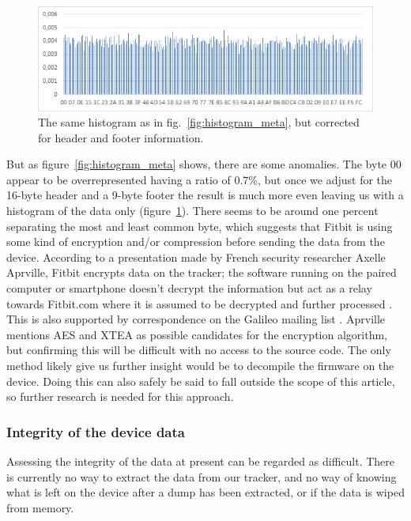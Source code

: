 \documentclass[a4paper,11pt,dvips]{article}
\begin{document}
\begin{figure}
\noindent
\includegraphics[natwidth=624bp,natheight=195bp,width=\linewidth]{histogram_nometa}
\caption{The same histogram as in fig.~\ref{fig:histogram_meta}, but corrected for header and footer information.}
\label{fig:histogram_nometa}
\end{figure}

But as figure~\ref{fig:histogram_meta} shows, there are some anomalies. The byte 00 appear to be overrepresented having a ratio of 0.7\%, but once we adjust for the 16-byte header and a 9-byte footer the result is much more even leaving us with a histogram of the data only (figure~\ref{fig:histogram_nometa}). There seems to be around one percent separating the most and least common byte, which suggests that Fitbit is using some kind of encryption and/or compression before sending the data from the device. According to a presentation made by French security researcher Axelle Aprville, Fitbit encrypts data on the tracker; the software running on the paired computer or smartphone doesn't decrypt the information but act as a relay towards Fitbit.com where it is assumed to be decrypted and further processed \citep{Aprville:2015a}. This is also supported by correspondence on the Galileo mailing list \citep{Allard:2014b}. Aprville mentions AES and XTEA as possible candidates for the encryption algorithm, but confirming this will be difficult with no access to the source code. The only method likely give us further insight would be to decompile the firmware on the device. Doing this can also safely be said to fall outside the scope of this article, so further research is needed for this approach.

\subsubsection{Integrity of the device data}
Assessing the integrity of the data at present can be regarded as difficult. There is currently no way to extract the data from our tracker, and no way of knowing what is left on the device after a dump has been extracted, or if the data is wiped from memory.
\end{document}
